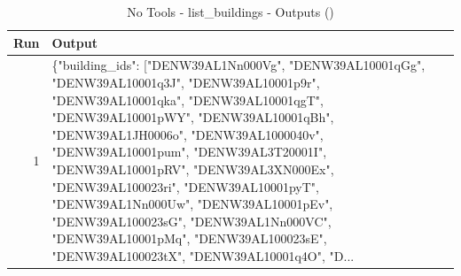 \documentclass[a4paper,11pt]{article}
\begin{document}
\begin{table}[ht]
\centering
\scriptsize
\caption{No Tools - list\_buildings - Outputs ()}
\label{tab:no\_tools\_list\_buildings\_outputs\_}
\begin{tabular}{r p{12cm}}
\hline
Run & Output \\
\hline
1 & \{"building\_ids": ["DENW39AL1Nn000Vg", "DENW39AL10001qGg", "DENW39AL10001q3J", "DENW39AL10001p9r", "DENW39AL10001qka", "DENW39AL10001qgT", "DENW39AL10001pWY", "DENW39AL10001qBh", "DENW39AL1JH0006o", "DENW39AL1000040v", "DENW39AL10001pum", "DENW39AL3T20001I", "DENW39AL10001pRV", "DENW39AL3XN000Ex", "DENW39AL100023ri", "DENW39AL10001pyT", "DENW39AL1Nn000Uw", "DENW39AL10001pEv", "DENW39AL100023sG", "DENW39AL1Nn000VC", "DENW39AL10001pMq", "DENW39AL100023sE", "DENW39AL100023tX", "DENW39AL10001q4O", "D... \\
\hline
\end{tabular}
\end{table}

\clearpage
\end{document}
